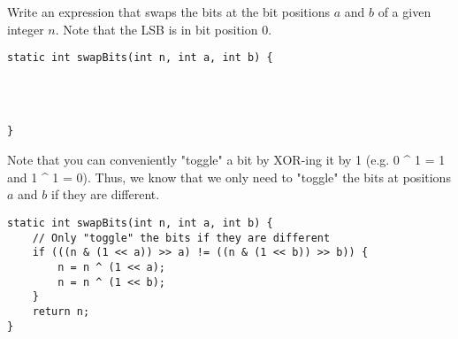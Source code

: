 \question Write an expression that swaps the bits at the bit positions $a$ and $b$ of a given integer $n$. Note that the LSB is in bit position 0.

\ifprintanswers\else
\begin{lstlisting}
static int swapBits(int n, int a, int b) {
    
    
    
    
}
\end{lstlisting}
\fi

\begin{solution}
Note that you can conveniently "toggle" a bit by XOR-ing it by 1 (e.g. 0 ^ 1 = 1 and 1 ^ 1 = 0). Thus, we know that we only need to "toggle" the bits at positions $a$ and $b$ if they are different.
\begin{lstlisting}
static int swapBits(int n, int a, int b) {
    // Only "toggle" the bits if they are different
    if (((n & (1 << a)) >> a) != ((n & (1 << b)) >> b)) {
        n = n ^ (1 << a);
        n = n ^ (1 << b);
    }
    return n;
}
\end{lstlisting}
\end{solution}